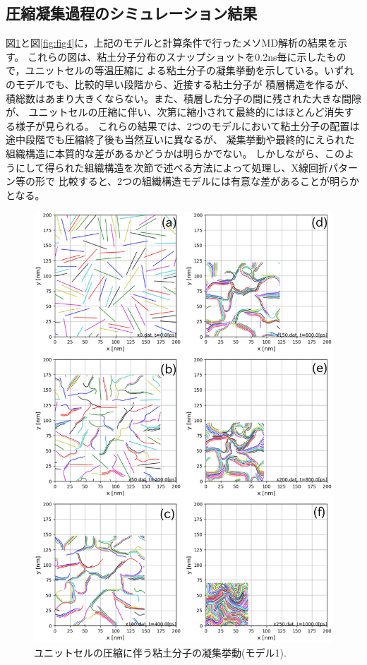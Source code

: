 \subsection{圧縮凝集過程のシミュレーション結果}
図\ref{fig:fig3}と図\ref{fig:fig4}に，上記のモデルと計算条件で行ったメソMD解析の結果を示す。
これらの図は、粘土分子分布のスナップショットを0.2ns毎に示したもので，ユニットセルの等温圧縮に
よる粘土分子の凝集挙動を示している。いずれのモデルでも、比較的早い段階から、近接する粘土分子が
積層構造を作るが、積総数はあまり大きくならない。また、積層した分子の間に残された大きな間隙が、
ユニットセルの圧縮に伴い、次第に縮小されて最終的にはほとんど消失する様子が見られる。
これらの結果では、2つのモデルにおいて粘土分子の配置は途中段階でも圧縮終了後も当然互いに異なるが、
凝集挙動や最終的にえられた組織構造に本質的な差があるかどうかは明らかでない。
しかしながら、このようにして得られた組織構造を次節で述べる方法によって処理し、X線回折パターン等の形で
比較すると、2つの組織構造モデルには有意な差があることが明らかとなる。
\begin{figure}[h]
	\begin{center}
	\includegraphics[width=1.0\linewidth]{Figs/fig3.eps} 
	\end{center}
	\caption{
		ユニットセルの圧縮に伴う粘土分子の凝集挙動(モデル1).
	} 
	\label{fig:fig3}
\end{figure}
